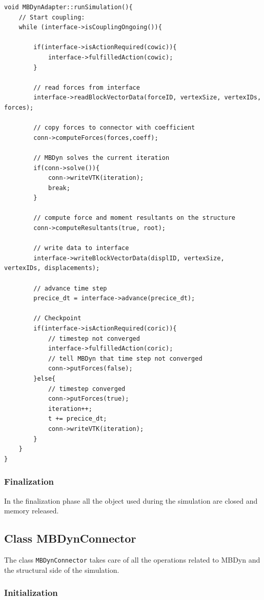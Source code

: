 \lstset{language=C++}
\begin{lstlisting}[caption=MBDynAdapter simulation execution,label=lst:adapter-exec]
void MBDynAdapter::runSimulation(){
	// Start coupling:
	while (interface->isCouplingOngoing()){

		if(interface->isActionRequired(cowic)){
			interface->fulfilledAction(cowic);
		}

		// read forces from interface
		interface->readBlockVectorData(forceID, vertexSize, vertexIDs, forces);

		// copy forces to connector with coefficient
		conn->computeForces(forces,coeff);

        // MBDyn solves the current iteration
		if(conn->solve()){
			conn->writeVTK(iteration);
			break;
		}
        
        // compute force and moment resultants on the structure
		conn->computeResultants(true, root);

		// write data to interface
		interface->writeBlockVectorData(displID, vertexSize, vertexIDs, displacements);

		// advance time step
		precice_dt = interface->advance(precice_dt);

		// Checkpoint
		if(interface->isActionRequired(coric)){
			// timestep not converged
			interface->fulfilledAction(coric);
			// tell MBDyn that time step not converged
			conn->putForces(false);
		}else{
			// timestep converged
			conn->putForces(true);
			iteration++;
			t += precice_dt;
			conn->writeVTK(iteration);
		}
	}
}

\end{lstlisting}


\subsubsection{Finalization}

In the finalization phase all the object used during the simulation are closed and memory released.

\subsection{Class MBDynConnector}
\label{sec:mbdyn-connector.h}

The class \texttt{MBDynConnector} takes care of all the operations related to MBDyn and the structural side of the simulation. 

\subsubsection{Initialization}


